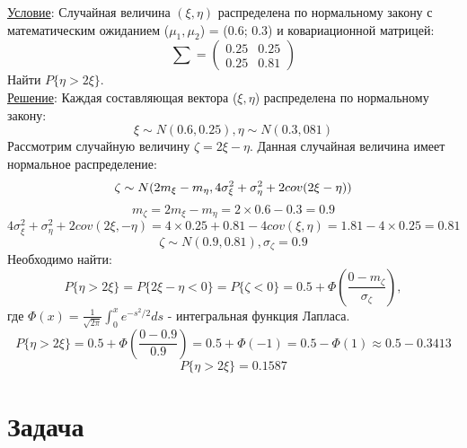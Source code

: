 \documentclass[a4paper,12pt]{article} %
\begin{document}
\underline{Условие}: Случайная величина $(\xi, \eta)$ распределена по нормальному закону с
математическим ожиданием ($\mu_1, \mu_2$) = (0.6; 0.3) и ковариационной матрицей:
\[
\sum =
 \left(
 \begin{array}{cc}
    0.25 & 0.25\\
    0.25 & 0.81
  \end{array}
  \right)
\]
Найти $P\{\eta > 2\xi\}$.\\
\underline{Решение}: Каждая составляющая вектора ($\xi, \eta$)
 распределена по нормальному закону:
\[
 \xi \sim N(0.6, 0.25), \eta \sim N(0.3, 081)
\]
Рассмотрим случайную величину $\zeta = 2\xi − \eta$.
Данная случайная величина имеет нормальное распределение:
\[
  \zeta \sim N(2m_\xi - m_\eta, 4\sigma^2_\xi + \sigma^2_\eta + 2cov(2\xi -\eta))\\
\]
\[
  m_\zeta = 2m_\xi - m_\eta = 2 \times 0.6 - 0.3 = 0.9
\]
\[
  4\sigma^2_\xi + \sigma^2_\eta + 2cov(2\xi, -\eta ) =
   4 \times 0.25 + 0.81 - 4cov(\xi, \eta) = 1.81 - 4 \times 0.25 = 0.81
\]
\[
  \zeta \sim N(0.9, 0.81), \sigma_\zeta = 0.9
\]
Необходимо найти:
\[
  P\{\eta > 2\xi\} = P\{2\xi - \eta < 0\} = P\{\zeta < 0\} = 0.5 +
  \Phi\left( \frac{0 - m_\zeta}{\sigma_\zeta} \right),
\]
где $\Phi(x) = \frac{1}{\sqrt{2\pi}}\int_0^xe^{-s^2/2}ds$ -
интегральная функция Лапласа.
\[
  P\{\eta > 2\xi\} = 0.5 + \Phi\left( \frac{0 - 0.9}{0.9} \right) =
  0.5 + \Phi(-1) = 0.5 - \Phi(1) \approx 0.5 - 0.3413
\]
\[
  P\{\eta > 2\xi\} = 0.1587
\]
\newpage
\section{Задача}
\end{document}
